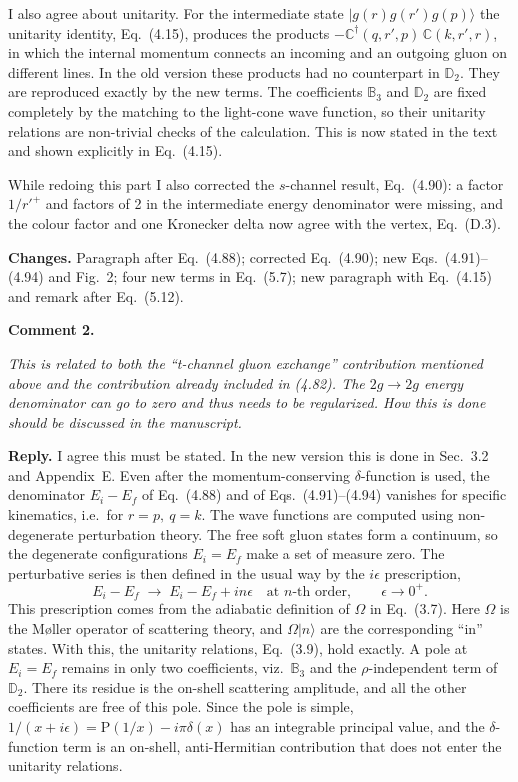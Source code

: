 \documentclass[11pt,a4paper]{article}
\newenvironment{comment}[1]{\par\medskip\noindent\textbf{Comment #1.}\par\vspace{2pt}%
  \begin{list}{}{\leftmargin=12pt\rightmargin=12pt}\item\itshape\small}{\end{list}\vspace{-2pt}}
\newcommand{\reply}{\noindent\textbf{Reply.} }
\newcommand{\changes}{\par\noindent\textbf{Changes.} }
\begin{document}
I also agree about unitarity. For the intermediate state $|g(r)g(r')g(p)\rangle$ the unitarity identity, Eq.~(4.15), produces the products $-\mathbb{C}^{\dagger}(q,r',p)\,\mathbb{C}(k,r',r)$, in which the internal momentum connects an incoming and an outgoing gluon on different lines. In the old version these products had no counterpart in $\mathbb{D}_{2}$. They are reproduced exactly by the new terms. The coefficients $\mathbb{B}_{3}$ and $\mathbb{D}_{2}$ are fixed completely by the matching to the light-cone wave function, so their unitarity relations are non-trivial checks of the calculation. This is now stated in the text and shown explicitly in Eq.~(4.15).

While redoing this part I also corrected the $s$-channel result, Eq.~(4.90): a factor $1/r'^{+}$ and factors of 2 in the intermediate energy denominator were missing, and the colour factor and one Kronecker delta now agree with the vertex, Eq.~(D.3).

\changes Paragraph after Eq.~(4.88); corrected Eq.~(4.90); new Eqs.~(4.91)--(4.94) and Fig.~2; four new terms in Eq.~(5.7); new paragraph with Eq.~(4.15) and remark after Eq.~(5.12).

\begin{comment}{2}
This is related to both the ``t-channel gluon exchange'' contribution mentioned above and the contribution already included in (4.82). The $2g\to2g$ energy denominator can go to zero and thus needs to be regularized. How this is done should be discussed in the manuscript.
\end{comment}

\reply I agree this must be stated. In the new version this is done in Sec.~3.2 and Appendix~E. Even after the momentum-conserving $\delta$-function is used, the denominator $E_{i}-E_{f}$ of Eq.~(4.88) and of Eqs.~(4.91)--(4.94) vanishes for specific kinematics, i.e.\ for $r=p,\ q=k$. The wave functions are computed using non-degenerate perturbation theory. The free soft gluon states form a continuum, so the degenerate configurations $E_{i}=E_{f}$ make a set of measure zero. The perturbative series is then defined in the usual way by the $i\epsilon$ prescription,
\begin{equation*}
E_{i}-E_{f}\;\to\;E_{i}-E_{f}+in\epsilon \quad\text{at $n$-th order},\qquad \epsilon\to0^{+}.
\end{equation*}
This prescription comes from the adiabatic definition of $\Omega$ in Eq.~(3.7). Here $\Omega$ is the M{\o}ller operator of scattering theory, and $\Omega|n\rangle$ are the corresponding ``in'' states. With this, the unitarity relations, Eq.~(3.9), hold exactly. A pole at $E_{i}=E_{f}$ remains in only two coefficients, viz.\ $\mathbb{B}_{3}$ and the $\rho$-independent term of $\mathbb{D}_{2}$. There its residue is the on-shell scattering amplitude, and all the other coefficients are free of this pole. Since the pole is simple, $1/(x+i\epsilon)=\mathrm{P}(1/x)-i\pi\delta(x)$ has an integrable principal value, and the $\delta$-function term is an on-shell, anti-Hermitian contribution that does not enter the unitarity relations.
\end{document}

